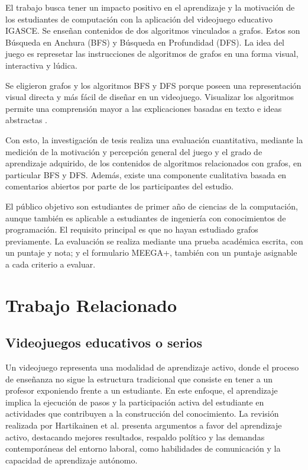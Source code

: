 El trabajo busca tener un impacto positivo en el aprendizaje y la motivación de los estudiantes de computación con la aplicación del videojuego educativo IGASCE. Se enseñan contenidos de dos algoritmos vinculados a grafos. Estos son Búsqueda en Anchura (BFS) y Búsqueda en Profundidad (DFS). La idea del juego es represetar las instrucciones de algoritmos de grafos en una forma visual, interactiva y lúdica.

Se eligieron grafos y los algoritmos BFS y DFS porque poseen una representación visual directa y más fácil de diseñar en un videojuego. Visualizar los algoritmos permite una comprensión mayor a las explicaciones basadas en texto e ideas abstractas \cite{surti2023NeoRoute}.

Con esto, la investigación de tesis realiza una evaluación cuantitativa, mediante la medición de la motivación y percepción general del juego y el grado de aprendizaje adquirido, de los contenidos de algoritmos relacionados con grafos, en particular BFS y DFS. Además, existe una componente cualitativa basada en comentarios abiertos por parte de los participantes del estudio.

El público objetivo son estudiantes de primer año de ciencias de la computación, aunque también es aplicable a estudiantes de ingeniería con conocimientos de programación. El requisito principal es que no hayan estudiado grafos previamente. La evaluación se realiza mediante una prueba académica escrita, con un puntaje y nota; y el formulario MEEGA+, también con un puntaje asignable a cada criterio a evaluar.


\section{Trabajo Relacionado}

\subsection{Videojuegos educativos o serios}

Un videojuego representa una modalidad de aprendizaje activo, donde el proceso de enseñanza no sigue la estructura tradicional que consiste en tener a un profesor exponiendo frente a un estudiante. En este enfoque, el aprendizaje implica la ejecución de pasos y la participación activa del estudiante en actividades que contribuyen a la construcción del conocimiento. La revisión realizada por Hartikainen et al. \cite{active_learning_review} presenta argumentos a favor del aprendizaje activo, destacando mejores resultados, respaldo político y las demandas contemporáneas del entorno laboral, como habilidades de comunicación y la capacidad de aprendizaje autónomo.

